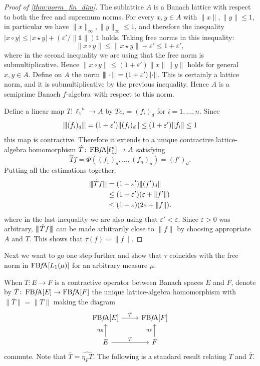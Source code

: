 \documentclass{memo-l}
\theoremstyle{definition}
\theoremstyle{remark}
\numberwithin{section}{chapter}
\numberwithin{equation}{chapter}
\newcommand{\el}[1]{\ensuremath{\ell_{#1}}}
\newcommand{\one}{\ensuremath{\mathbb{1}}}
\newcommand{\falg}{$f\!$-algebra}
\newcommand{\FBFA}[1]{\operatorname{FB{\it f}\!A}[#1]}
\newcommand{\trinor}[1]{{\vert\kern-0.25ex\vert\kern-0.25ex\vert #1 
    \vert\kern-0.25ex\vert\kern-0.25ex\vert}}
\begin{document}
\begin{proof}[Proof of \cref{thm:norm_fin_dim}]
    The sublattice $A$ is a
    Banach lattice with respect to both the free and supremum norms.
    For every $x,y \in A$ with $\|x\|
    ,\|y\|\le 1$, in particular we have $\|x\|_\infty ,\|y\|_\infty
    \le 1$, and therefore the inequality $|x\circ y|\le |x\star y| +
    (\varepsilon '/\|\one\|)\one$ holds. Taking free norms in this inequality:
    \[
        \|x\circ y\|\le \|x\star y\| + \varepsilon '\le 1+\varepsilon
        ',
    \]
    where in the second inequality we are using that the free norm is
    submultiplicative.
    Hence $\|x\circ y\|\le (1+\varepsilon ')\|x\| \|y\|$ holds for
    general $x,y \in A$. Define on $A$ the norm $\trinor{\cdot
    }=(1+\varepsilon ')\|{\cdot }\|$. This is certainly a lattice
    norm, and it is submultiplicative by the previous inequality.
    Hence $A$ is a semiprime Banach \falg\ with respect to this norm.

    Define a linear map $T\colon \el 1^{n}\to A$ by $Te_i=(f _i)_d$
    for $i=1,\ldots ,n$. Since
    \[
        \trinor{(f_i)_d}=(1+\varepsilon ')\|(f_i)_d\|\le
        (1+\varepsilon ')\|f_i\|\le 1
    \]
    this map is contractive.
    Therefore it extends to a unique contractive
    lattice-algebra homomorphism $\hat{T}\colon \FBFA {\el 1^{n}}\to
    A$ satisfying
    \[
    \hat{T}f=\Phi ( (f_1)_d,\ldots ,(f_n)_d)=(f')_d.
    \]
    Putting all the estimations together:
    \begin{align*}
        \trinor{\hat{T}f}&=(1+\varepsilon ') \|(f')_d\|\\
                         &\le(1+\varepsilon ')(\varepsilon +\|f'\|)\\
                         &\le(1+\varepsilon )(2\varepsilon +\|f\|).
    \end{align*}
    where in the last inequality we are also using that $\varepsilon
    '<\varepsilon $. Since $\varepsilon >0$ was arbitrary, $\trinor{\hat{T}f}$ can be made arbitrarily close to
    $\|f\|$ by choosing appropriate $A$ and $T$. This shows that $\tau (f)=\|f\|$.
\end{proof}

Next we want to go one step further and show that $\tau $ coincides
with the free norm in $\FBFA {L_1(\mu )}$ for an arbitrary measure
$\mu $.

When $T\colon E\to F$ is a contractive operator between Banach spaces $E$ and
$F$, denote by $\bar{T}\colon \FBFA E\to \FBFA F$ the unique
lattice-algebra homomorphism with $\|\bar{T}\|=\|T\|$ making the
diagram
\[
\begin{tikzcd}
    \FBFA E\arrow[r, "\bar{T}"]&\FBFA F\\
    E\arrow[u, "\eta _E"]\arrow[r, "T"]&F\arrow[u, "\eta _F"]
\end{tikzcd}
\]
commute. Note that $\bar{T}=\widehat{\eta _F T}$. The following is a
standard result relating $T$ and $\bar{T}$.
\end{document}
